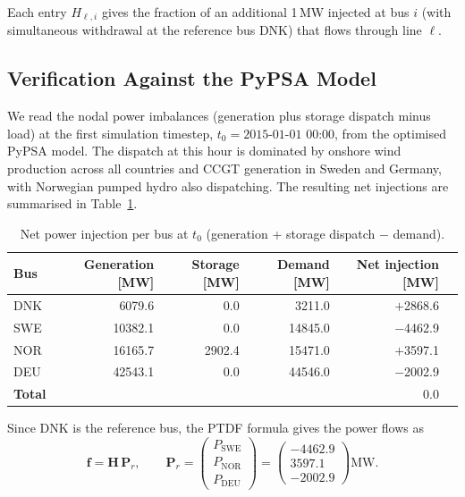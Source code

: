 Each entry $H_{\ell,i}$ gives the fraction of an additional 1\,MW injected at bus $i$ (with simultaneous withdrawal at the reference bus DNK) that flows through line $\ell$.

\subsection*{Verification Against the PyPSA Model}

We read the nodal power imbalances (generation plus storage dispatch minus load) at the first simulation timestep, $t_0 = \text{2015-01-01 00:00}$, from the optimised PyPSA model. The dispatch at this hour is dominated by onshore wind production across all countries and CCGT generation in Sweden and Germany, with Norwegian pumped hydro also dispatching. The resulting net injections are summarised in Table~\ref{tab:net_injection}.

\begin{table}[h]
\centering
\caption{Net power injection per bus at $t_0$ (generation + storage dispatch $-$ demand).}
\label{tab:net_injection}
\begin{tabular}{lrrrrr}
\toprule
Bus & Generation [MW] & Storage [MW] & Demand [MW] & Net injection [MW] \\
\midrule
DNK & 6079.6  & 0.0    & 3211.0  & $+$2868.6  \\
SWE & 10382.1 & 0.0    & 14845.0 & $-$4462.9  \\
NOR & 16165.7 & 2902.4 & 15471.0 & $+$3597.1  \\
DEU & 42543.1 & 0.0    & 44546.0 & $-$2002.9  \\
\midrule
\textbf{Total} & & & & $0.0$ \\
\bottomrule
\end{tabular}
\end{table}

Since DNK is the reference bus, the PTDF formula gives the power flows as
\begin{equation}
    \mathbf{f} = \mathbf{H}\,\mathbf{P}_r,
    \qquad
    \mathbf{P}_r = \begin{pmatrix} P_\text{SWE} \\ P_\text{NOR} \\ P_\text{DEU} \end{pmatrix}
    = \begin{pmatrix} -4462.9 \\ 3597.1 \\ -2002.9 \end{pmatrix} \text{MW}.
\end{equation}

